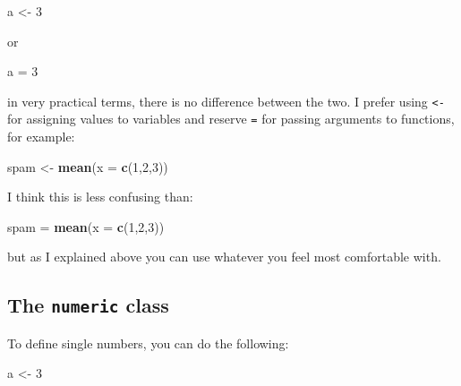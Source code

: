 \documentclass[]{gitbook}
\newenvironment{Shaded}{\begin{snugshade}}{\end{snugshade}}
\newcommand{\DataTypeTok}[1]{\textcolor[rgb]{0.13,0.29,0.53}{#1}}
\newcommand{\DecValTok}[1]{\textcolor[rgb]{0.00,0.00,0.81}{#1}}
\newcommand{\KeywordTok}[1]{\textcolor[rgb]{0.13,0.29,0.53}{\textbf{#1}}}
\newcommand{\NormalTok}[1]{#1}
\newcommand{\StringTok}[1]{\textcolor[rgb]{0.31,0.60,0.02}{#1}}
\begin{document}
\begin{Shaded}
\begin{Highlighting}[]
\NormalTok{a <-}\StringTok{ }\DecValTok{3}
\end{Highlighting}
\end{Shaded}

or

\begin{Shaded}
\begin{Highlighting}[]
\NormalTok{a =}\StringTok{ }\DecValTok{3}
\end{Highlighting}
\end{Shaded}

in very practical terms, there is no difference between the two. I prefer using \texttt{\textless{}-} for assigning
values to variables and reserve \texttt{=} for passing arguments to functions, for example:

\begin{Shaded}
\begin{Highlighting}[]
\NormalTok{spam <-}\StringTok{ }\KeywordTok{mean}\NormalTok{(}\DataTypeTok{x =} \KeywordTok{c}\NormalTok{(}\DecValTok{1}\NormalTok{,}\DecValTok{2}\NormalTok{,}\DecValTok{3}\NormalTok{))}
\end{Highlighting}
\end{Shaded}

I think this is less confusing than:

\begin{Shaded}
\begin{Highlighting}[]
\NormalTok{spam =}\StringTok{ }\KeywordTok{mean}\NormalTok{(}\DataTypeTok{x =} \KeywordTok{c}\NormalTok{(}\DecValTok{1}\NormalTok{,}\DecValTok{2}\NormalTok{,}\DecValTok{3}\NormalTok{))}
\end{Highlighting}
\end{Shaded}

but as I explained above you can use whatever you feel most comfortable with.

\hypertarget{the-numeric-class}{%
\subsection{\texorpdfstring{The \texttt{numeric} class}{The numeric class}}\label{the-numeric-class}}

To define single numbers, you can do the following:

\begin{Shaded}
\begin{Highlighting}[]
\NormalTok{a <-}\StringTok{ }\DecValTok{3}
\end{Highlighting}
\end{Shaded}
\end{document}
